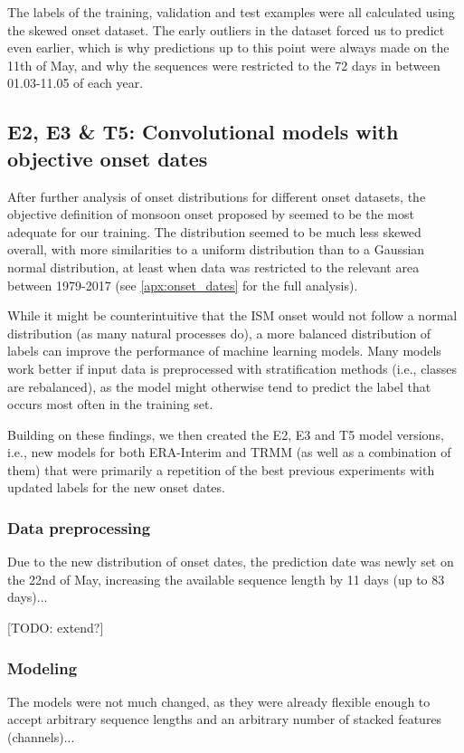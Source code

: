 The labels of the training, validation and test examples were all calculated using the skewed onset dataset. The early outliers in the dataset forced us to predict even earlier, which is why predictions up to this point were always made on the 11th of May, and why the sequences were restricted to the 72 days in between 01.03-11.05 of each year.


\subsection{E2, E3 \& T5: Convolutional models with objective onset dates}
\label{sst:nn_e2t5}
After further analysis of onset distributions for different onset datasets, the objective definition of monsoon onset proposed by \citet{Singh.2009} seemed to be the most adequate for our training. The distribution seemed to be much less skewed overall, with more similarities to a uniform distribution than to a Gaussian normal distribution, at least when data was restricted to the relevant area between 1979-2017 (see \cref{apx:onset_dates} for the full analysis).

While it might be counterintuitive that the ISM onset would not follow a normal distribution (as many natural processes do), a more balanced distribution of labels can improve the performance of machine learning models. Many models work better if input data is preprocessed with stratification methods (i.e., classes are rebalanced), as the model might otherwise tend to predict the label that occurs most often in the training set.

Building on these findings, we then created the E2, E3 and T5 model versions, i.e., new models for both ERA-Interim and TRMM (as well as a combination of them) that were primarily a repetition of the best previous experiments with updated labels for the new onset dates.

\subsubsection{Data preprocessing}
\label{ssst:nn_e2t5_data}
Due to the new distribution of onset dates, the prediction date was newly set on the 22nd of May, increasing the available sequence length by 11 days (up to 83 days)...

[TODO: extend?]

\subsubsection{Modeling}
\label{ssst:nn_e2t5_modeling}
The models were not much changed, as they were already flexible enough to accept arbitrary sequence lengths and an arbitrary number of stacked features (channels)...

